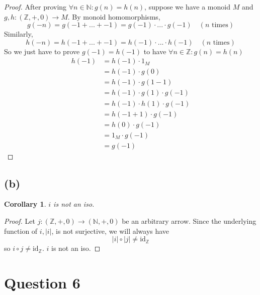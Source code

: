 \documentclass[11pt]{article} %
\newtheorem{corollary}[theorem]{Corollary}
\theoremstyle{definition}
\begin{document}
{\color{teal}
\begin{proof}
After proving $\forall n\in\mathbb{N}:g(n)=h(n)$,
suppose we have a monoid $M$ and $g,h:(\mathbb{Z}, +, 0)\rightarrow M$.
By monoid homomorphisms,
\[g(-n)=g(-1+...+-1)=g(-1)\cdot...\cdot g(-1)\quad (n \text{ times})\]
Similarly,
\[h(-n)=h(-1+...+-1)=h(-1)\cdot...\cdot h(-1)\quad (n \text{ times})\]
So we just have to prove $g(-1)=h(-1)$ to have $\forall n\in\mathbb{Z}:g(n)=h(n)$
\begin{equation}
\begin{aligned}
    h(-1)&=h(-1)\cdot 1_M\\
    &=h(-1)\cdot g(0)\\
    &=h(-1)\cdot g(1-1)\\
    &=h(-1)\cdot g(1)\cdot g(-1)\\
    &=h(-1)\cdot h(1)\cdot g(-1)\\
    &=h(-1+1)\cdot g(-1)\\
    &=h(0)\cdot g(-1)\\
    &=1_M\cdot g(-1)\\
    &= g(-1)
\end{aligned}
\end{equation}
\end{proof}
}

\subsection*{(b)}
\begin{corollary}
    $i$ is not an iso.
\end{corollary}
\begin{proof}
    Let $j:(\mathbb{Z},+,0)\rightarrow (\mathbb{N},+,0)$ be an arbitrary arrow.
    Since the underlying function of $i, |i|$, is not surjective, 
    we will always have 
    \[|i|\circ|j|\neq\text{id}_{\mathbb{Z}}\]
    so $i\circ j \neq \text{id}_{\mathbb{Z}}$.
    $i$ is not an iso.
\end{proof}


\section*{Question 6}
\addtocounter{section}{1}
\end{document}
